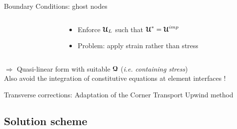 \begin{frame}%
  \begin{block}{\footnotesize Boundary Conditions: ghost nodes}
    \begin{columns}
      \begin{column}{0.3\textwidth}
        
      \end{column}
      \begin{column}{0.6\textwidth}
        \begin{scriptsize}
          \begin{itemize}
          \item[] Enforce ${\boldsymbol{\mathcal{U}}}_L$ such that ${\boldsymbol{\mathcal{U}}}^*={\boldsymbol{\mathcal{U}}}^{imp}$
          \item[] Problem: apply strain rather than stress 
          \end{itemize}
        \end{scriptsize}
      \end{column}	
    \end{columns}
  \end{block}
  \begin{scriptsize}
  $\Rightarrow $ Quasi-linear form with suitable ${\boldsymbol{\mathcal{Q}}}$ (\textit{i.e. containing stress})\\
  \alert{Also avoid the integration of constitutive equations at element interfaces !}
  \end{scriptsize}
  \begin{block}{\footnotesize Transverse corrections: Adaptation of the Corner Transport Upwind method \cite{Colella_CTU}}
    \centering
    
  \end{block}
\end{frame}

\subsection{Solution scheme}
%


